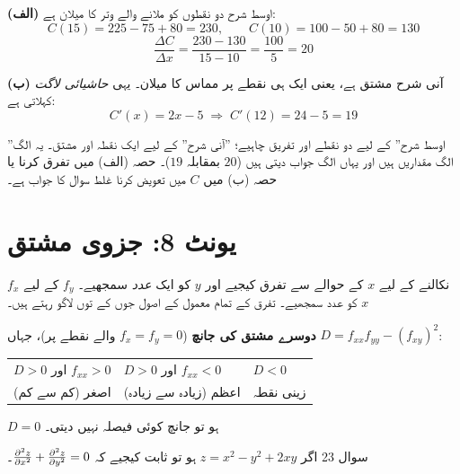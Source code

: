 \begin{hal}
\textbf{(الف)} اوسط شرح دو نقطوں کو ملانے والے وتر کا میلان ہے:
\[
C(15)=225-75+80=230,\qquad C(10)=100-50+80=130
\]
\[
\frac{\Delta C}{\Delta x}=\frac{230-130}{15-10}=\frac{100}{5}=20
\]

\textbf{(ب)} آنی شرح مشتق ہے، یعنی ایک ہی نقطے پر مماس کا میلان۔ یہی
\emph{حاشیائی لاگت} کہلاتی ہے:
\[
C'(x)=2x-5 \;\Longrightarrow\; C'(12)=24-5=19
\]

\end{hal}

\begin{ghalti}
''اوسط شرح'' کے لیے دو نقطے اور تفریق چاہیے؛ ''آنی شرح'' کے لیے ایک نقطہ اور
مشتق۔ یہ الگ الگ مقداریں ہیں اور یہاں الگ جواب دیتی ہیں (\(20\) بمقابلہ
\(19\))۔ حصہ (الف) میں تفرق کرنا یا حصہ (ب) میں \(C\) میں تعویض کرنا غلط سوال کا
جواب ہے۔
\end{ghalti}

\section*{یونٹ \textenglish{8}: جزوی مشتق}

\begin{nukta}
\(f_x\) نکالنے کے لیے \(x\) کے حوالے سے تفرق کیجیے اور \(y\) کو ایک
\emph{عدد} سمجھیے۔ \(f_y\) کے لیے \(x\) کو عدد سمجھیے۔ تفرق کے تمام معمول کے
اصول جوں کے توں لاگو رہتے ہیں۔

\medskip
\textbf{دوسرے مشتق کی جانچ} (\(f_x=f_y=0\) والے نقطے پر)، جہاں
\(D=f_{xx}f_{yy}-(f_{xy})^{2}\):
\begin{center}
\begin{tabular}{@{}p{4.4cm} p{4.4cm} p{4.0cm}@{}}
\toprule
\(D>0\) اور \(f_{xx}>0\) & \(D>0\) اور \(f_{xx}<0\) & \(D<0\) \\
اصغر (کم سے کم) & اعظم (زیادہ سے زیادہ) & زینی نقطہ \\
\bottomrule
\end{tabular}
\end{center}
\(D=0\) ہو تو جانچ کوئی فیصلہ نہیں دیتی۔
\end{nukta}

\begin{sawal}{سوال \textenglish{23}}
اگر \(z=x^{2}-y^{2}+2xy\) ہو تو ثابت کیجیے کہ
\(\frac{\partial^{2} z}{\partial x^{2}}+\frac{\partial^{2} z}{\partial y^{2}}=0\)۔
\end{sawal}

